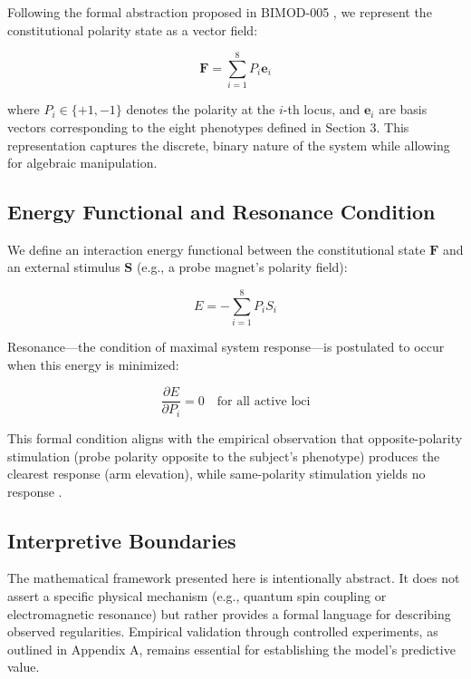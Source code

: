 \documentclass[12pt,a4paper]{article}
\begin{document}
Following the formal abstraction proposed in BIMOD-005 \cite{yoon2026_005}, we represent the constitutional polarity state as a vector field:

\[
\mathbf{F} = \sum_{i=1}^{8} P_i \mathbf{e}_i
\]

where \(P_i \in \{+1, -1\}\) denotes the polarity at the \(i\)-th locus, and \(\mathbf{e}_i\) are basis vectors corresponding to the eight phenotypes defined in Section 3. This representation captures the discrete, binary nature of the system while allowing for algebraic manipulation.

\subsection{Energy Functional and Resonance Condition}

We define an interaction energy functional between the constitutional state \(\mathbf{F}\) and an external stimulus \(\mathbf{S}\) (e.g., a probe magnet's polarity field):

\[
E = -\sum_{i=1}^{8} P_i S_i
\]

Resonance—the condition of maximal system response—is postulated to occur when this energy is minimized:

\[
\frac{\partial E}{\partial P_i} = 0 \quad \text{for all active loci}
\]

This formal condition aligns with the empirical observation that opposite-polarity stimulation (probe polarity opposite to the subject's phenotype) produces the clearest response (arm elevation), while same-polarity stimulation yields no response \cite{yoon2026_004}.

\subsection{Interpretive Boundaries}

The mathematical framework presented here is intentionally abstract. It does not assert a specific physical mechanism (e.g., quantum spin coupling or electromagnetic resonance) but rather provides a formal language for describing observed regularities. Empirical validation through controlled experiments, as outlined in Appendix A, remains essential for establishing the model's predictive value.

\end{document}
